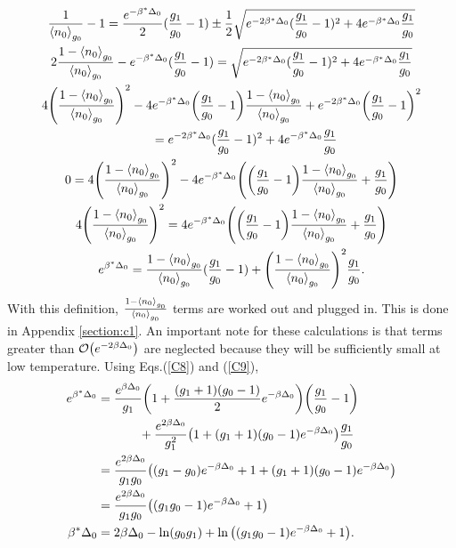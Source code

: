 \begin{gather}
    \frac{1}{\left<{n_0}\right>_{g_0}}-1=\frac{e^{-\beta^*\Delta_0}}{2}(\frac{g_1}{g_0}-1)\pm \frac{1}{2}\sqrt{e^{-2\beta^*\Delta_0} (\frac{g_1}{g_0}-1)^2+ 4e^{-\beta^*\Delta_0}\frac{g_1}{g_0}}\nonumber\\
    2\frac{1-\left<{n_0}\right>_{g_0}}{\left<{n_0}\right>_{g_0}}-e^{-\beta^*\Delta_0}(\frac{g_1}{g_0}-1)=\sqrt{e^{-2\beta^*\Delta_0} (\frac{g_1}{g_0}-1)^2+ 4e^{-\beta^*\Delta_0}\frac{g_1}{g_0}}\nonumber\\
    4\qty(\frac{1-\left<{n_0}\right>_{g_0}}{\left<{n_0}\right>_{g_0}})^2-4e^{-\beta^*\Delta_0}\qty(\frac{g_1}{g_0}-1) \frac{1-\left<{n_0}\right>_{g_0}}{\left<{n_0}\right>_{g_0}}+e^{-2\beta^*\Delta_0} \qty(\frac{g_1}{g_0}-1)^2\nonumber\\ 
    \ \ \ \ \ \ \  =e^{-2\beta^*\Delta_0} (\frac{g_1}{g_0}-1)^2+ 4e^{-\beta^*\Delta_0}\frac{g_1}{g_0} \nonumber\nonumber\\
    0=4\qty(\frac{1-\left<{n_0}\right>_{g_0}}{\left<{n_0}\right>_{g_0}})^2- 4e^{-\beta^*\Delta_0}\qty(\qty(\frac{g_1}{g_0}-1)\frac{1-\left<{n_0}\right>_{g_0}}{\left<{n_0}\right>_{g_0}}+\frac{g_1}{g_0})\nonumber\\
    4\qty(\frac{1-\left<{n_0}\right>_{g_0}}{\left<{n_0}\right>_{g_0}})^2=4e^{-\beta^*\Delta_0}\qty(\qty(\frac{g_1}{g_0}-1)\frac{1-\left<{n_0}\right>_{g_0}}{\left<{n_0}\right>_{g_0}}+\frac{g_1}{g_0})\nonumber\\
    e^{\beta^* \Delta_0}=\frac{1-\left<{n_0}\right>_{g_0}}{\left<{n_0}\right>_{g_0}}(\frac{g_1}{g_0}-1)+\qty(\frac{1-\left<{n_0}\right>_{g_0}}{\left<{n_0}\right>_{g_0}})^2\frac{g_1}{g_0}.
\end{gather}
With this definition, $\frac{1-\left<{n_0}\right>_{g_0}}{\left<{n_0}\right>_{g_0}}$ terms are worked out and plugged in. This is done in Appendix \ref{section:c1}. An important note for these calculations is that terms greater than $\mathcal{O}\qty(e^{-2\beta \Delta_0})$ are neglected because they will be sufficiently small at low temperature. Using Eqs.\@ (\ref{C8}) and (\ref{C9}),
\begin{align}
    e^{\beta^* \Delta_0}&=\frac{e^{\beta\Delta_0}}{g_1}\qty(1+\frac{(g_1+1)(g_0-1)}{2}e^{-\beta\Delta_0})\qty(\frac{g_1}{g_0}-1)\nonumber\\
    &\ \ \ \ \ \ \ \ \ \ +\frac{e^{2\beta\Delta_0}}{g_1^2}\qty(1+(g_1+1)(g_0-1)e^{-\beta\Delta_0})\frac{g_1}{g_0}\nonumber\\
    &=\frac{e^{2\beta\Delta_0}}{g_1g_0}\qty((g_1-g_0)e^{-\beta\Delta_0}+1+(g_1+1)(g_0-1)e^{-\beta\Delta_0})\nonumber\\
    &=\frac{e^{2\beta\Delta_0}}{g_1g_0}\qty((g_1g_0-1)e^{-\beta\Delta_0}+1)\\
    \beta^*\Delta_0&=2\beta\Delta_0-\ln(g_0g_1)+\ln\qty((g_1g_0-1)e^{-\beta\Delta_0}+1).
\end{align}
